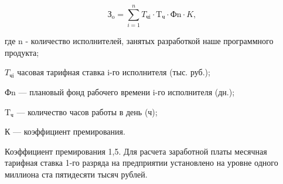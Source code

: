 \begin{equation}
  \text{З}_{\text{o}} = \sum\limits_{i=1}^n T_{\text{чi}} \cdot \text{T}_{\text{ч}} \cdot \text{Ф}{\text{n}} \cdot K,
\end{equation}

где n - количество исполнителей, занятых разработкой наше программного продукта;      

\( T_{\text{чi}} \) часовая тарифная ставка i-го исполнителя (тыс. руб.);

\( \text{Ф}{\text{n}} \) --- плановый фонд рабочего времени i-го исполнителя (дн.);

\( \text{T}_{\text{ч}} \) --- количество часов работы в день (ч);

К --- коэффициент премирования.

Коэффициент премирования 1,5. Для расчета заработной платы месячная тарифная ставка 1-го разряда на предприятии установлено на уровне одного миллиона ста пятидесяти тысяч рублей.

\newpage

